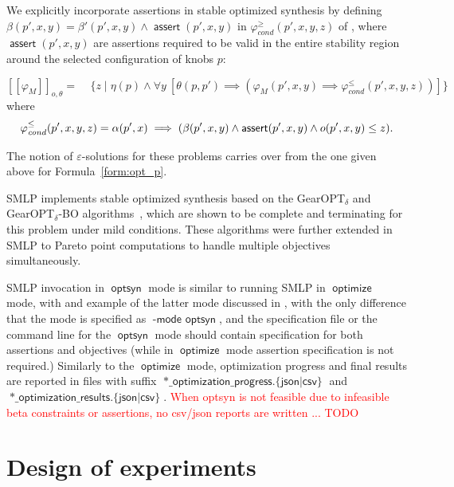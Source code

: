 \documentclass[a4paper,parskip=half]{article} %
\newcommand*\eqdef=
\newcommand*\assert{\operatorname{\mathsf{assert}}}
\newcommand*\regmax[2]{[[{#1}]]_{#2}}
\newcommand*\objv{o}
\newcommand*\option[1]{\operatorname{\mathsf{#1}}} %
\newcommand*\optionval[2]{\operatorname{\mathsf{#1}\,\,\mathsf{#2}}} %
\newcommand*\suffix[1]{\operatorname{\mathsf{#1}}} %
\newcommand*\mode[1]{\operatorname{\mathsf{#1}}} %
\newcommand\todozk[1]{\textcolor{red}{#1}}
\newcommand*\ZK{\todozk}
\begin{document}
We explicitly incorporate assertions in stable optimized synthesis by defining $\beta(p',x,y)\eqdef \beta'(p',x,y) \wedge \assert(p',x,y)$ in $\varphi_{\mathit{cond}}^{\geq}(p',x,y,z)$ of , where  $\assert(p',x,y)$ are assertions required to be valid in the entire stability region around the selected configuration of knobs $p$:

\begin{equation}\label{form:optsyn}
\regmax{\varphi_M}{\objv,\theta}
\eqdef
\mathop{\max\limits_{p}} \mathop{\min\limits_{x, p'}}
\{ z \mid \eta(p) \wedge
    \forall y~[
     \theta(p,p') \implies
     (\varphi_M(p',x,y)  \implies  \varphi_{\mathit{cond}}^{\leq}(p',x,y,z))]\}
\end{equation}
where \[
\varphi_{\mathit{cond}}^{\leq}(p',x,y,z)
\eqdef\alpha(p',x) \implies ( \beta(p',x,y) \wedge \assert(p',x,y) \wedge \objv(p',x,y) \leq z)\text.\]


The notion of $\varepsilon$-solutions for these problems carries over from the one given above for Formula~\eqref{form:opt_p}.

SMLP implements stable optimized synthesis based on the GearOPT$_\delta$ and GearOPT$_\delta$-BO 
algorithms~\cite{DBLP:conf/fmcad/BrausseKK20,DBLP:conf/ijcai/BrausseKK22}, which are shown to be complete and terminating 
for this problem under mild conditions. 
These algorithms were further extended in SMLP to Pareto point computations to handle multiple objectives simultaneously.

SMLP invocation in $\mode{optsyn}$ mode is similar to running SMLP in $\mode{optimize}$ mode, with and example of the latter 
mode discussed in , with the only difference that the mode is specified as $\optionval{-mode}{optsyn}$, and
the specification file or the command line for the  $\option{optsyn}$ mode should contain specification for
both assertions and objectives (while in  $\option{optimize}$ mode assertion specification is not required.)
Similarly to the $\option{optimize}$ mode, optimization progress and final results are reported in files with suffix
$\suffix{*\_optimization\_progress.\{json|csv\}}$ and  $\suffix{*\_optimization\_results.\{json|csv\}}$. 
\ZK{When optsyn is not feasible due to infeasible beta constraints or assertions, no csv/json reports are written ... TODO}

 
\section{Design of experiments}\label{sec:doe}
\end{document}
